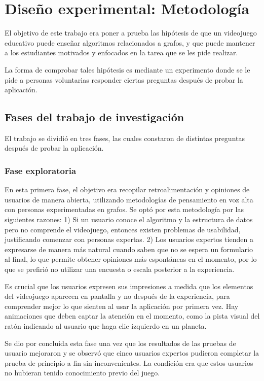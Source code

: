 \chapter{Diseño experimental: Metodología}

El objetivo de este trabajo era poner a prueba las hipótesis de que un videojuego educativo puede enseñar algoritmos relacionados a grafos, y que puede mantener a los estudiantes motivados y enfocados en la tarea que se les pide realizar. 

La forma de comprobar tales hipótesis es mediante un experimento donde se le pide a personas voluntarias responder ciertas preguntas después de probar la aplicación.

\section{Fases del trabajo de investigación}

El trabajo se dividió en tres fases, las cuales constaron de distintas preguntas después de probar la aplicación.

\subsection{Fase exploratoria}

En esta primera fase, el objetivo era recopilar retroalimentación y opiniones de usuarios de manera abierta, utilizando metodologías de pensamiento en voz alta con personas experimentadas en grafos. Se optó por esta metodología por las siguientes razones: 1) Si un usuario conoce el algoritmo y la estructura de datos pero no comprende el videojuego, entonces existen problemas de usabilidad, justificando comenzar con personas expertas. 2) Los usuarios expertos tienden a expresarse de manera más natural cuando saben que no se espera un formulario al final, lo que permite obtener opiniones más espontáneas en el momento, por lo que se prefirió no utilizar una encuesta o escala posterior a la experiencia.

Es crucial que los usuarios expresen sus impresiones a medida que los elementos del videojuego aparecen en pantalla y no después de la experiencia, para comprender mejor lo que sienten al usar la aplicación por primera vez. Hay animaciones que deben captar la atención en el momento, como la pista visual del ratón indicando al usuario que haga clic izquierdo en un planeta.

Se dio por concluida esta fase una vez que los resultados de las pruebas de usuario mejoraron y se observó que cinco usuarios expertos pudieron completar la prueba de principio a fin sin inconvenientes. La condición era que estos usuarios no hubieran tenido conocimiento previo del juego.



